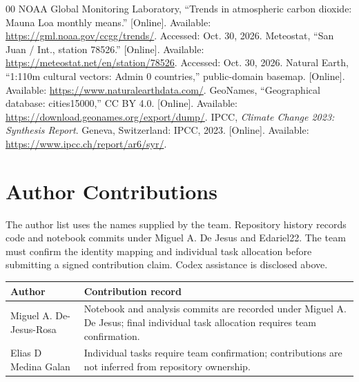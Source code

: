 \documentclass[conference]{IEEEtran}
\begin{document}
\begin{thebibliography}{00}
 NOAA Global Monitoring Laboratory, ``Trends in atmospheric carbon dioxide: Mauna Loa monthly means.'' [Online]. Available: \url{https://gml.noaa.gov/ccgg/trends/}. Accessed: Oct. 30, 2026.
 Meteostat, ``San Juan / Int., station 78526.'' [Online]. Available: \url{https://meteostat.net/en/station/78526}. Accessed: Oct. 30, 2026.
 Natural Earth, ``1:110m cultural vectors: Admin 0 countries,'' public-domain basemap. [Online]. Available: \url{https://www.naturalearthdata.com/}.
 GeoNames, ``Geographical database: cities15000,'' CC BY 4.0. [Online]. Available: \url{https://download.geonames.org/export/dump/}.
 IPCC, \emph{Climate Change 2023: Synthesis Report}. Geneva, Switzerland: IPCC, 2023. [Online]. Available: \url{https://www.ipcc.ch/report/ar6/syr/}.
\end{thebibliography}

\section*{Author Contributions}
The author list uses the names supplied by the team. Repository history records code and notebook commits under Miguel A. De Jesus and Edariel22. The team must confirm the identity mapping and individual task allocation before submitting a signed contribution claim. Codex assistance is disclosed above.
\begin{table}[h]\centering\footnotesize
\begin{tabular}{p{}p{}}
\toprule Author & Contribution record \\\midrule
Miguel A. De-Jesus-Rosa & Notebook and analysis commits are recorded under Miguel A. De Jesus; final individual task allocation requires team confirmation. \\
Elias D Medina Galan & Individual tasks require team confirmation; contributions are not inferred from repository ownership. \\\bottomrule
\end{tabular}\end{table}
\end{document}

